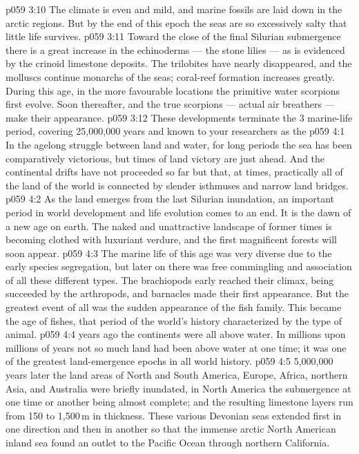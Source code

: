 \vs p059 3:10 The climate is even and mild, and marine fossils are laid down in the arctic regions. But by the end of this epoch the seas are so excessively salty that little life survives.
\vs p059 3:11 Toward the close of the final Silurian submergence there is a great increase in the echinoderms --- the stone lilies --- as is evidenced by the crinoid limestone deposits. The trilobites have nearly disappeared, and the molluscs continue monarchs of the seas; coral\hyp{}reef formation increases greatly. During this age, in the more favourable locations the primitive water scorpions first evolve. Soon thereafter, and  the true scorpions --- actual air breathers --- make their appearance.
\vs p059 3:12 These developments terminate the 3 marine\hyp{}life period, covering 25,000,000 years and known to your researchers as the 
\vs p059 4:1 In the agelong struggle between land and water, for long periods the sea has been comparatively victorious, but times of land victory are just ahead. And the continental drifts have not proceeded so far but that, at times, practically all of the land of the world is connected by slender isthmuses and narrow land bridges.
\vs p059 4:2 As the land emerges from the last Silurian inundation, an important period in world development and life evolution comes to an end. It is the dawn of a new age on earth. The naked and unattractive landscape of former times is becoming clothed with luxuriant verdure, and the first magnificent forests will soon appear.
\vs p059 4:3 The marine life of this age was very diverse due to the early species segregation, but later on there was free commingling and association of all these different types. The brachiopods early reached their climax, being succeeded by the arthropods, and barnacles made their first appearance. But the greatest event of all was the sudden appearance of the fish family. This became the age of fishes, that period of the world’s history characterized by the  type of animal.
\vs p059 4:4 \pc {} years ago the continents were all above water. In millions upon millions of years not so much land had been above water at one time; it was one of the greatest land\hyp{}emergence epochs in all world history.
\vs p059 4:5 5,000,000 years later the land areas of North and South America, Europe, Africa, northern Asia, and Australia were briefly inundated, in North America the submergence at one time or another being almost complete; and the resulting limestone layers run from 150 to 1,500\,m in thickness. These various Devonian seas extended first in one direction and then in another so that the immense arctic North American inland sea found an outlet to the Pacific Ocean through northern California.
